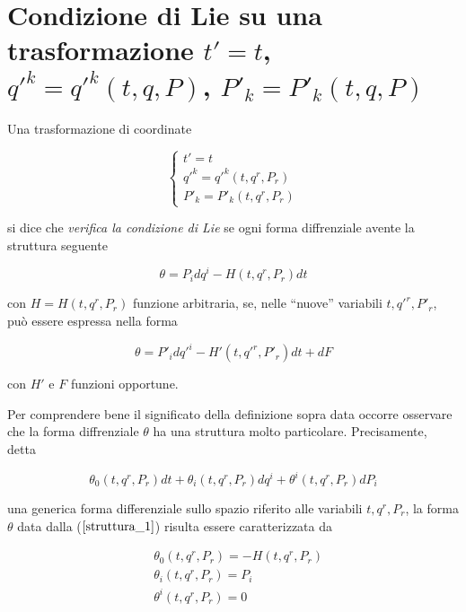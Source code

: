 \section{Condizione di Lie su una trasformazione $ t' = t$, $ q'^k = q'^k(t,q,P) $, $P'_k = P'_k (t,q,P)$}
\setcounter{equation}{0}

\begin{definizione}
Una trasformazione di coordinate

\begin{equation}
  \begin{cases}
    t' = t \\
    q'^k = q'^k (t, q^r, P_r) \\ 
    P'_k = P'_k (t, q^r, P_r)
  \end{cases}
  \label{eq:eq1_condLie}
\end{equation}

si dice che \textit{verifica la condizione di Lie} se ogni forma diffrenziale avente la struttura seguente

\begin{equation} \label{struttura_1}
  \theta = P_i dq^i - H (t, q^r, P_r) dt
\end{equation}

con $ H = H (t, q^r, P_r) $ funzione arbitraria, se, nelle ``nuove'' variabili $ t, q'^r, P'_r $, può essere espressa nella forma

\begin{equation}
  \theta = {P'}_i {dq'}^i - H'(t, {q'}^r, {P'}_r) dt + dF
  \label{struttura_2}
\end{equation}

con $ H' $ e $ F $ funzioni opportune.
\end{definizione}

Per comprendere bene il significato della definizione sopra data occorre osservare che la forma diffrenziale $ \theta $ ha una struttura molto particolare. Precisamente, detta

\begin{equation*}
  \theta_0 (t, q^r, P_r) dt + \theta_i (t, q^r, P_r) dq^i + \theta^i (t, q^r, P_r) dP_i
\end{equation*}

una generica forma differenziale sullo spazio riferito alle variabili $ t, q^r, P_r $, la forma $ \theta $ data dalla ($ \ref{struttura_1} $) risulta essere caratterizzata da

\begin{equation*}
  \begin{split}
    & \theta_0 (t, q^r, P_r) = - H (t, q^r, P_r) \\
    & \theta_i (t, q^r, P_r) = P_i \\
    & \theta^i (t, q^r, P_r) = 0
  \end{split}
\end{equation*}

